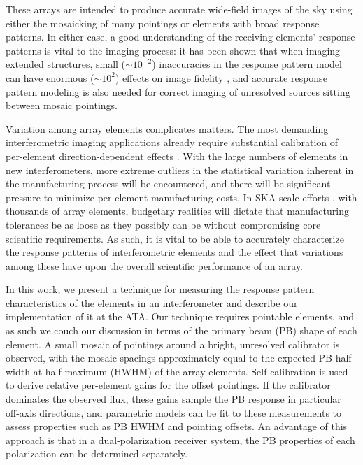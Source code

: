 \documentclass[preprint]{aastex}
\begin{document}
These arrays are intended to produce accurate wide-field images of the
sky using either the mosaicking of many pointings or elements with
broad response patterns. In either case, a good understanding of the
receiving elements' response patterns is vital to the imaging process:
it has been shown that when imaging extended structures, small
($\sim$$10^{-2}$) inaccuracies in the response pattern model can have
enormous ($\sim$$10^2$) effects on image fidelity \citep{chu93,wc08},
and accurate response pattern modeling is also needed for correct
imaging of unresolved sources sitting between mosaic pointings.

Variation among array elements complicates matters. The most demanding
interferometric imaging applications already require substantial
calibration of per-element direction-dependent effects
\citep{bcgu08,ns10}. With the large numbers of elements in new
interferometers, more extreme outliers in the statistical variation
inherent in the manufacturing process will be encountered, and there
will be significant pressure to minimize per-element manufacturing
costs. In SKA-scale efforts \citep{theska}, with thousands of array
elements, budgetary realities will dictate that manufacturing
tolerances be as loose as they possibly can be without compromising
core scientific requirements. As such, it is vital to be able to
accurately characterize the response patterns of interferometric
elements and the effect that variations among these have upon the
overall scientific performance of an array.

In this work, we present a technique for measuring the response
pattern characteristics of the elements in an interferometer and
describe our implementation of it at the ATA. Our technique requires
pointable elements, and as such we couch our discussion in terms of
the primary beam (PB) shape of each element. A small mosaic of
pointings around a bright, unresolved calibrator is observed, with the
mosaic spacings approximately equal to the expected PB half-width at
half maximum (HWHM) of the array elements. Self-calibration
\citep{pr84} is used to derive relative per-element gains for the
offset pointings. If the calibrator dominates the observed flux, these
gains sample the PB response in particular off-axis directions, and
parametric models can be fit to these measurements to assess
properties such as PB HWHM and pointing offsets. An advantage of this
approach is that in a dual-polarization receiver system, the PB
properties of each polarization can be determined separately.
\end{document}
